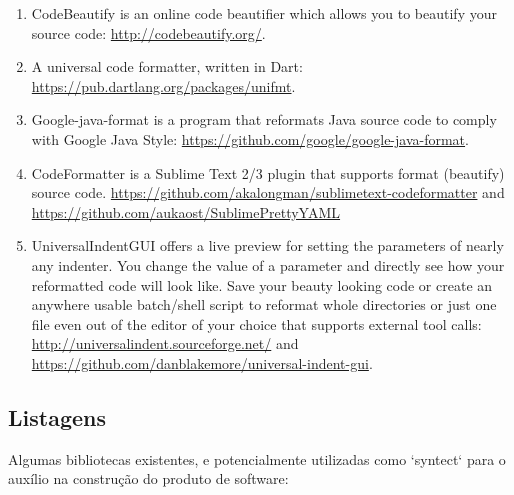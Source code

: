    \medskip
    \begin{myquote}
    \begin{enumerate}[leftmargin=*]

        \item

        CodeBeautify is an online code beautifier which allows you to beautify your source code:
        \url{http://codebeautify.org/}.

        \item

        A universal code formatter, written in Dart: \url{https://pub.dartlang.org/packages/unifmt}.

        \item

        Google-java-format is a program that reformats Java source code to comply with Google Java
        Style: \url{https://github.com/google/google-java-format}.

        \item

        CodeFormatter is a Sublime Text 2/3 plugin that supports format (beautify) source code.
        \url{https://github.com/akalongman/sublimetext-codeformatter} and
        \url{https://github.com/aukaost/SublimePrettyYAML}

        \item

        UniversalIndentGUI offers a live preview for setting the parameters of nearly any indenter.
        You change the value of a parameter and directly see how your reformatted code will look
        like. Save your beauty looking code or create an anywhere usable batch/shell script to
        reformat whole directories or just one file even out of the editor of your choice that
        supports external tool calls: \url{http://universalindent.sourceforge.net/} and
        \url{https://github.com/danblakemore/universal-indent-gui}.

    \end{enumerate}
    \end{myquote}


\subsection{Listagens}

    Algumas bibliotecas existentes, e potencialmente utilizadas como `syntect` para o auxílio na
    construção do produto de software:

